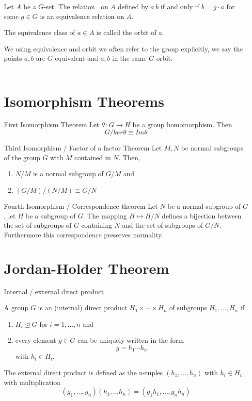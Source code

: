\begin{proposition}
Let $A$ be a $G$-set. The relation $~$ on $A$ defined by $a ~ b$ if and only if $b = g\cdot a $ for some $g \in G$ is an equivalence relation on $A$.
\end{proposition}

\begin{definition}
The equivalence class of $a \in A$ is called the orbit of $a$.
\end{definition}
We using equivalence and orbit we often refer to the group explicitly, we say the points $a,b$ are $G$-equivalent and $a,b$ in the same $G$-orbit. \\
\\

\section{Isomorphism Theorems}
\begin{theorem}{First Isomorphism Theorem}
Let $\theta \, : G \rightarrow H$ be a group homomorphism. Then
$$ G/ker\theta \cong Im \theta$$
\end{theorem}

\begin{theorem}{Third Isomorphism / Factor of a factor Theorem}
Let $M,N$ be normal subgroups of the group $G$ with $M$ contained in $N$. Then,
\begin{enumerate}
\item $N/M$ is a normal subgroup of $G/M$ and
\item $(G/M)/(N/M) \cong G/N$
\end{enumerate}
\end{theorem}

\begin{theorem}{Fourth Isomorphism / Correspondence theorem}
Let $N$ be a normal subgroup of $G$, let $H$ be a subgroup of $G$. The mapping $H \mapsto H/N$ defines a bijection between the set of subgroups of $G$ containing $N$ and the set of subgroups of $G/N$. Furthermore this correspondence preserves normality.
\end{theorem}

\section{Jordan-Holder Theorem}
\begin{definition}{Internal / external direct product}

A group $G$ is an (internal) direct product $H_1 \times \cdots \times H_n$ of subgroups $H_1, \ldots, H_n$ if 
\begin{enumerate}
\item $H_i \trianglelefteq G$ for $i = 1, \ldots , n$ and 
\item every element $g \in G$ can be uniquely written in the form 
$$g = h_1 \cdots h_n$$
with $h_i \in H_i$.
\end{enumerate}

The external direct product is defined as the n-tuples $(h_1, \ldots, h_n)$ with $h_i \in H_i$, with multiplication
$$ (g_1, \ldots, g_n)(h_1, \ldots h_n ) = (g_1 h_1,\ldots,g_n h_n)$$
\end{definition}


